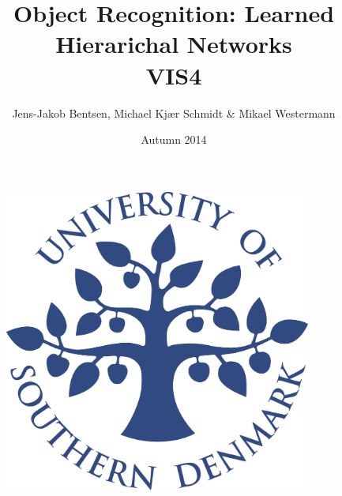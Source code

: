 \title{Object Recognition: Learned Hierarichal Networks\\VIS4}
\author{Jens-Jakob Bentsen, Michael Kjær Schmidt \& Mikael Westermann}
\date{Autumn 2014}
\begin{figure}
\centering
\includegraphics[width=0.9\textwidth]{graphics/forside.png}
\end{figure}
\maketitle